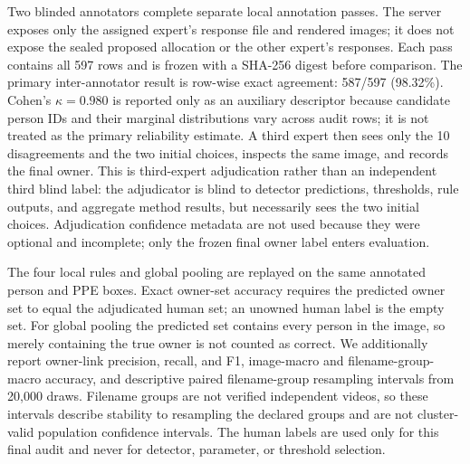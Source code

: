 \documentclass[iicol,pdflatex,sn-mathphys-num]{sn-jnl}
\begin{document}
Two blinded annotators complete separate local annotation passes. The server exposes only the assigned expert's response file and rendered images; it does not expose the sealed proposed allocation or the other expert's responses. Each pass contains all 597 rows and is frozen with a SHA-256 digest before comparison. The primary inter-annotator result is row-wise exact agreement: 587/597 (98.32\%). Cohen's $\kappa=0.980$ is reported only as an auxiliary descriptor because candidate person IDs and their marginal distributions vary across audit rows; it is not treated as the primary reliability estimate. A third expert then sees only the 10 disagreements and the two initial choices, inspects the same image, and records the final owner. This is third-expert adjudication rather than an independent third blind label: the adjudicator is blind to detector predictions, thresholds, rule outputs, and aggregate method results, but necessarily sees the two initial choices. Adjudication confidence metadata are not used because they were optional and incomplete; only the frozen final owner label enters evaluation.

The four local rules and global pooling are replayed on the same annotated person and PPE boxes. Exact owner-set accuracy requires the predicted owner set to equal the adjudicated human set; an unowned human label is the empty set. For global pooling the predicted set contains every person in the image, so merely containing the true owner is not counted as correct. We additionally report owner-link precision, recall, and F1, image-macro and filename-group-macro accuracy, and descriptive paired filename-group resampling intervals from 20,000 draws. Filename groups are not verified independent videos, so these intervals describe stability to resampling the declared groups and are not cluster-valid population confidence intervals. The human labels are used only for this final audit and never for detector, parameter, or threshold selection.
\end{document}
